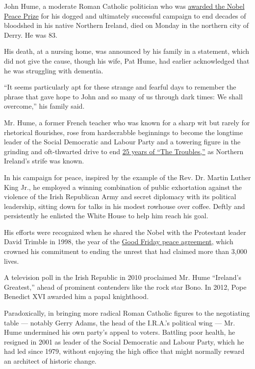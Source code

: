 John Hume, a moderate Roman Catholic politician who was
\href{https://www.nytimes3xbfgragh.onion/1998/10/17/world/2-ulster-peacemakers-win-the-nobel-prize.html}{awarded
the Nobel Peace Prize} for his dogged and ultimately successful campaign
to end decades of bloodshed in his native Northern Ireland, died on
Monday in the northern city of Derry. He was 83.

His death, at a nursing home, was announced by his family in a
statement, which did not give the cause, though his wife, Pat Hume, had
earlier acknowledged that he was struggling with dementia.

``It seems particularly apt for these strange and fearful days to
remember the phrase that gave hope to John and so many of us through
dark times: We shall overcome,'' his family said.

Mr. Hume, a former French teacher who was known for a sharp wit but
rarely for rhetorical flourishes, rose from hardscrabble beginnings to
become the longtime leader of the Social Democratic and Labour Party and
a towering figure in the grinding and oft-thwarted drive to end
\href{https://www.nytimes3xbfgragh.onion/2018/10/04/world/europe/northern-ireland-troubles.html}{25
years of ``The Troubles,''} as Northern Ireland's strife was known.

In his campaign for peace, inspired by the example of the Rev. Dr.
Martin Luther King Jr., he employed a winning combination of public
exhortation against the violence of the Irish Republican Army and secret
diplomacy with its political leadership, sitting down for talks in his
modest rowhouse over coffee. Deftly and persistently he enlisted the
White House to help him reach his goal.

His efforts were recognized when he shared the Nobel with the Protestant
leader David Trimble in 1998, the year of the
\href{https://www.nytimes3xbfgragh.onion/1998/04/11/world/irish-accord-overview-irish-talks-produce-accord-stop-decades-bloodshed-with.html}{Good
Friday peace agreement}, which crowned his commitment to ending the
unrest that had claimed more than 3,000 lives.

A television poll in the Irish Republic in 2010 proclaimed Mr. Hume
``Ireland's Greatest,'' ahead of prominent contenders like the rock star
Bono. In 2012, Pope Benedict XVI awarded him a papal knighthood.

Paradoxically, in bringing more radical Roman Catholic figures to the
negotiating table --- notably Gerry Adams, the head of the I.R.A.'s
political wing --- Mr. Hume undermined his own party's appeal to voters.
Battling poor health, he resigned in 2001 as leader of the Social
Democratic and Labour Party, which he had led since 1979, without
enjoying the high office that might normally reward an architect of
historic change.

